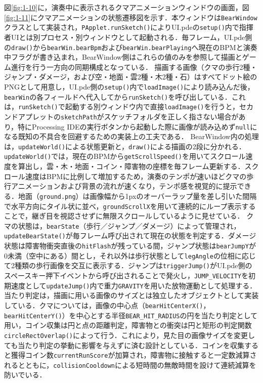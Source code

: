 \documentclass[uplatex,dvipdfmx]{jlreq}
\begin{document}
図\ref{fig:1-10}に，演奏中に表示されるクマアニメーションウィンドウの画面，図\ref{fig:1-11}にクマアニメーションの状態遷移図を示す．本ウィンドウは\texttt{BearWindow}クラスとして実装され，\texttt{PApplet.runSketch()}によりUI.pdeの\texttt{setup()}内で指揮者UIとは別プロセス・別ウィンドウとして起動される．毎フレーム，UI.pde側の\texttt{draw()}から\texttt{bearWin.bearBpm}および\texttt{bearWin.bearPlaying}へ現在のBPMと演奏中フラグが書き込まれ，BearWindow側はこれらの値のみを参照して描画とゲーム進行を行う一方向の同期構成となっている．
描画する画像（クマの歩行2種・ジャンプ・ダメージ，および空・地面・雲2種・木2種・石）はすべてドット絵のPNGとして用意し，UI.pde側の\texttt{setup()}内で\texttt{loadImage()}により読み込んだ後，\texttt{bearWin}の各フィールドへ代入してから\texttt{runSketch()}を呼び出している．これは，\texttt{runSketch()}で起動する別ウィンドウ内で直接\texttt{loadImage()}を行うと，セカンドアプレットの\texttt{sketchPath}がスケッチフォルダを正しく指さない場合があり，特にProcessing IDEの実行ボタンから起動した際に画像が読み込めず\texttt{null}になる既知の不具合を回避するための実装上の工夫である．
BearWindow内の処理は，\texttt{updateWorld()}による状態更新と，\texttt{draw()}による描画の2段に分かれる．\texttt{updateWorld()}では，現在のBPMから\texttt{getScrollSpeed()}を用いてスクロール速度を算出し，雲・木・地面・コイン・障害物の座標を毎フレーム更新する．スクロール速度はBPMに比例して増加するため，演奏のテンポが速いほどクマの歩行アニメーションおよび背景の流れが速くなり，テンポ感を視覚的に提示できる．地面（\texttt{ground.png}）は画像幅から1pxのオーバーラップ量を差し引いた間隔で水平方向にタイル状に並べ，\texttt{groundScrollX}を用いて連続的にループ表示することで，継ぎ目を視認させずに無限スクロールしているように見せている．
クマの状態は，\texttt{bearState}（歩行／ジャンプ／ダメージ）によって管理され，\texttt{updateBearState()}が毎フレーム呼び出されて現在の状態を判定する．ダメージ状態は障害物衝突直後の\texttt{hitFlash}が残っている間，ジャンプ状態は\texttt{bearJumpY}が0未満（空中にある）間とし，それ以外は歩行状態として\texttt{legAngle}の位相に応じて2種類の歩行画像を交互に表示する．ジャンプは\texttt{triggerJump()}がUI.pde側のスペースキー押下イベントから呼び出されることで発火し，\texttt{JUMP\_VELOCITY}を初期速度として\texttt{updateJump()}内で重力\texttt{GRAVITY}を用いた放物運動として処理する．
当たり判定は，描画に用いる画像のサイズとは独立したオブジェクトとして実装している．クマについては，画像の中心点（\texttt{bearHitCenterX()}，\texttt{bearHitCenterY()}）を中心とする半径\texttt{BEAR\_HIT\_RADIUS}の円を当たり判定として用い，コイン収集は円と点の距離判定，障害物との衝突は円と矩形の判定関数\texttt{circleRectOverlap()}によって行う．これにより，見た目の画像サイズを変更しても当たり判定の挙動に影響を与えずに済む設計としている．コインを収集すると獲得コイン数\texttt{currentRunScore}が加算され，障害物に接触すると一定数減算されるとともに，\texttt{collisionCooldown}による短時間の無敵時間を設けて連続減算を防いでいる．
\end{document}
